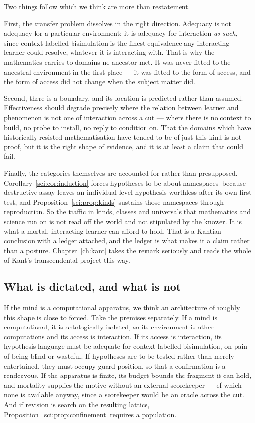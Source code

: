 Two things follow which we think are more than restatement.

First, the transfer problem dissolves in the right direction. Adequacy is not adequacy for a particular
environment; it is adequacy for interaction \emph{as such}, since context-labelled bisimulation is the
finest equivalence any interacting learner could resolve, whatever it is interacting with. That is why
the mathematics carries to domains no ancestor met. It was never fitted to the ancestral environment
in the first place --- it was fitted to the form of access, and the form of access did not change when
the subject matter did.

Second, there is a boundary, and its location is predicted rather than assumed. Effectiveness should
degrade precisely where the relation between learner and phenomenon is not one of interaction across a
cut --- where there is no context to build, no probe to install, no reply to condition on. That the
domains which have historically resisted mathematisation have tended to be of just this kind is not
proof, but it is the right shape of evidence, and it is at least a claim that could fail.

Finally, the categories themselves are accounted for rather than presupposed.
Corollary~\ref{sci:cor:induction} forces hypotheses to be about namespaces, because destructive assay
leaves an individual-level hypothesis worthless after its own first test, and
Proposition~\ref{sci:prop:kinds} sustains those namespaces through reproduction. So the traffic in kinds,
classes and universals that mathematics and science run on is not read off the world and not stipulated
by the knower. It is what a mortal, interacting learner can afford to hold. That is a Kantian
conclusion with a ledger attached, and the ledger is what makes it a claim rather than a posture.
Chapter~\ref{ch:kant} takes the remark seriously and reads the whole of Kant's transcendental
project this way.

\subsection{What is dictated, and what is not}\label{sci:S17.4}

If the mind is a computational apparatus, we think an architecture of roughly this shape is close to
forced. Take the premises separately. If a mind is computational, it is ontologically isolated, so its
environment is other computations and its access is interaction. If its access is interaction, its
hypothesis language must be adequate for context-labelled bisimulation, on pain of being blind or
wasteful. If hypotheses are to be tested rather than merely entertained, they must occupy guard
position, so that a confirmation is a rendezvous. If the apparatus is finite, its budget bounds the
fragment it can hold, and mortality supplies the motive without an external scorekeeper --- of which
none is available anyway, since a scorekeeper would be an oracle across the cut. And if revision is
search on the resulting lattice, Proposition~\ref{sci:prop:confinement} requires a population.

